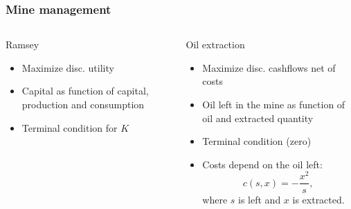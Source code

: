 \documentclass[handout,a4paper]{beamer} 			%
\begin{document}
\begin{frame}
    \frametitle{Mine management} 
    \begin{columns}
	\begin{column}{5cm}
	    \begin{block}{Ramsey}
		\begin{itemize}
		    \item Maximize disc. utility
		
		    \item Capital as function of capital, production 
		    and consumption
		
		    \item Terminal condition for $K$
		\end{itemize}
		\end{block}
		\end{column}
\pause		
	\begin{column}{5cm}
	    \begin{block}{Oil extraction}
		\begin{itemize}
		    \item Maximize disc. cashflows net of costs
		
		    \item Oil left in the mine as function of oil and 
		    extracted quantity
		
		    \item Terminal condition (zero)
		    
		    \item Costs depend on the oil left:
		    $$
		    c(s,x)=-\frac{x^{2}}{s},
		    $$
		    where $s$ is left and $x$ is extracted.
		    
		\end{itemize}
		\end{block}
		\end{column}
	\end{columns}

\end{frame}



\end{document}
